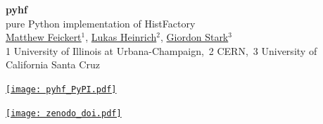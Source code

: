 \documentclass[a0,portrait]{a0poster}
\begin{document}
%
%
%
\begin{minipage}[b]{0.6\linewidth}
 \VERYHuge \color{Black} \textbf{pyhf} \color{Black}\\[0.5cm] %
 \Huge{pure Python implementation of HistFactory}\\[1cm] %
 \color{DarkSlateGray} %
 \LARGE {\href{https://www.matthewfeickert.com/}{\underline{Matthew Feickert}$^{1}$}}, \href{http://www.lukasheinrich.com/}{Lukas Heinrich$^{2}$}, \href{https://giordonstark.com/}{Giordon Stark$^{3}$}\\[0.5cm] %
 \normalsize {1 University of Illinois at Urbana-Champaign,~2 CERN,~3 University of California Santa Cruz}\\[1cm]%
 \color{Black}
 \begin{minipage}{0.2\linewidth}
  \begin{center}
   \href{https://pypi.org/project/pyhf/}{\texttt{[image: pyhf\_PyPI.pdf]}}
  \end{center}
 \end{minipage}%
 \quad
 \begin{minipage}{0.3\linewidth}
  \begin{center}
   \href{https://doi.org/10.5281/zenodo.1169739}{\texttt{[image: zenodo\_doi.pdf]}}
  \end{center}
 \end{minipage}%
\end{minipage}
\end{document}
